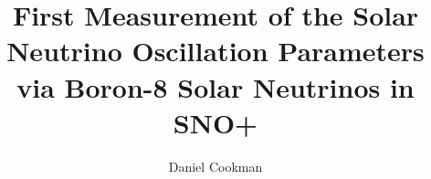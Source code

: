 \title{First Measurement of the Solar Neutrino Oscillation Parameters via Boron-8 Solar Neutrinos in SNO+}


\author{Daniel Cookman}








     



\renewcommand{\submissiontext}{A thesis submitted in fulfilment of the requirements for the degree of}




